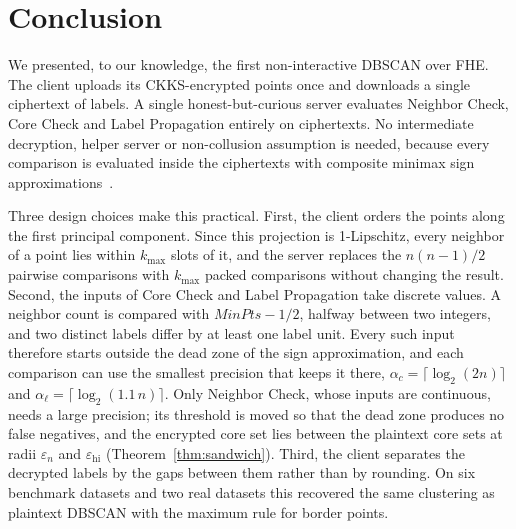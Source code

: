 
\providecommand{\MinPts}{\mathit{MinPts}}
\providecommand{\kmax}{k_{\max}}
\providecommand{\epsn}{\varepsilon_n}

\section{Conclusion}\label{sec:conclusion}

We presented, to our knowledge, the first non-interactive DBSCAN over FHE.
The client uploads its CKKS-encrypted points once and downloads a single
ciphertext of labels.
A single honest-but-curious server evaluates Neighbor Check, Core Check
and Label Propagation entirely on ciphertexts.
No intermediate decryption, helper server or non-collusion assumption is
needed, because every comparison is evaluated inside the ciphertexts with
composite minimax sign approximations~\cite{lee2021minimax}.

Three design choices make this practical.
First, the client orders the points along the first principal component.
Since this projection is 1-Lipschitz, every neighbor of a point lies within
$\kmax$ slots of it, and the server replaces the $n(n-1)/2$ pairwise
comparisons with $\kmax$ packed comparisons without changing the result.
Second, the inputs of Core Check and Label Propagation take discrete
values. A neighbor count is compared with $\MinPts - 1/2$, halfway between
two integers, and two distinct labels differ by at least one label unit.
Every such input therefore starts outside the dead zone of the sign
approximation, and each comparison can use the smallest precision that
keeps it there, $\alpha_c = \lceil \log_2(2n) \rceil$ and
$\alpha_\ell = \lceil \log_2(1.1\,n) \rceil$. Only Neighbor Check, whose
inputs are continuous, needs a large precision; its threshold is moved so
that the dead zone produces no false negatives, and the encrypted core set
lies between the plaintext core sets at radii $\epsn$ and
$\varepsilon_{\mathrm{hi}}$ (Theorem~\ref{thm:sandwich}).
Third, the client separates the decrypted labels by the gaps between them
rather than by rounding. On six benchmark datasets and two real datasets
this recovered the same
clustering as plaintext DBSCAN with the maximum rule for border points.